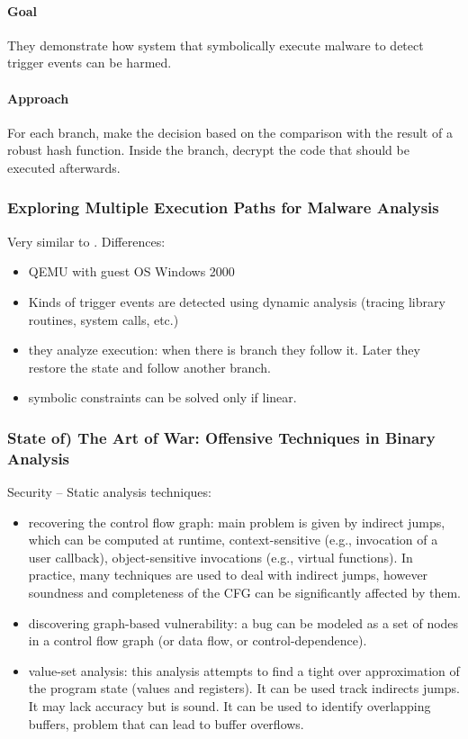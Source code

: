 \paragraph{Goal}
They demonstrate how system that symbolically execute malware to detect trigger events can be harmed.

\paragraph{Approach}
For each branch, make the decision based on the comparison with the result of a robust hash function. Inside the branch, decrypt the code that should be executed afterwards.

\subsubsection{\cite{MKK-SP07} Exploring Multiple Execution Paths for Malware Analysis} 

Very similar to \cite{MineSweeper-BOTNET08}. Differences:
\begin{itemize}
  \item QEMU with guest OS Windows 2000
  \item Kinds of trigger events are detected using dynamic analysis (tracing library routines, system calls, etc.)
  \item they analyze execution: when there is branch they follow it. Later they restore the state and follow another branch.
  \item symbolic constraints can be solved only if linear.
\end{itemize}

\subsubsection{\cite{ANGR-SP16} State of) The Art of War: Offensive Techniques in Binary Analysis} 

Security -- Static analysis techniques:
\begin{itemize}
  \item recovering the control flow graph: main problem is given by indirect jumps, which can be computed at runtime, context-sensitive (e.g., invocation of a user callback), object-sensitive invocations (e.g., virtual functions). In practice, many techniques are used to deal with indirect jumps, however soundness and completeness of the CFG can be significantly affected by them.
  \item discovering graph-based vulnerability: a bug can be modeled as a set of nodes in a control flow graph (or data flow, or control-dependence).
  \item value-set analysis: this analysis attempts to find a tight over approximation of the program state (values and registers). It can be used track indirects jumps. It may lack accuracy but is sound. It can be used to identify overlapping buffers, problem that can lead to buffer overflows.
\end{itemize}


